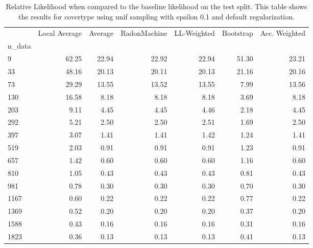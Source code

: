 \begin{table}
\centering
\caption{Relative Likelihood when compared to the baseline likelihood on the test split. This table shows the results for  covertype using  unif sampling with epsilon  0.1 and  default regularization.}
\label{tab:8}
\begin{tabular}{lrrrrrr}
\toprule
{} &  Local Average &  Average &  RadonMachine &  LL-Weighted &  Bootstrap &  Acc. Weighted \\
n\_data &                &          &               &              &            &                \\
\midrule
9      &          62.25 &    22.94 &         22.92 &        22.94 &      51.30 &          23.21 \\
33     &          48.16 &    20.13 &         20.11 &        20.13 &      21.16 &          20.16 \\
73     &          29.29 &    13.55 &         13.52 &        13.55 &       7.99 &          13.56 \\
130    &          16.58 &     8.18 &          8.18 &         8.18 &       3.69 &           8.18 \\
203    &           9.11 &     4.45 &          4.45 &         4.46 &       2.18 &           4.45 \\
292    &           5.21 &     2.50 &          2.50 &         2.51 &       1.69 &           2.50 \\
397    &           3.07 &     1.41 &          1.41 &         1.42 &       1.24 &           1.41 \\
519    &           2.03 &     0.91 &          0.91 &         0.91 &       1.23 &           0.91 \\
657    &           1.42 &     0.60 &          0.60 &         0.60 &       1.16 &           0.60 \\
810    &           1.05 &     0.43 &          0.43 &         0.43 &       0.81 &           0.43 \\
981    &           0.78 &     0.30 &          0.30 &         0.30 &       0.70 &           0.30 \\
1167   &           0.60 &     0.22 &          0.22 &         0.22 &       0.77 &           0.22 \\
1369   &           0.52 &     0.20 &          0.20 &         0.20 &       0.37 &           0.20 \\
1588   &           0.43 &     0.16 &          0.16 &         0.16 &       0.31 &           0.16 \\
1823   &           0.36 &     0.13 &          0.13 &         0.13 &       0.41 &           0.13 \\
\bottomrule
\end{tabular}
\end{table}
